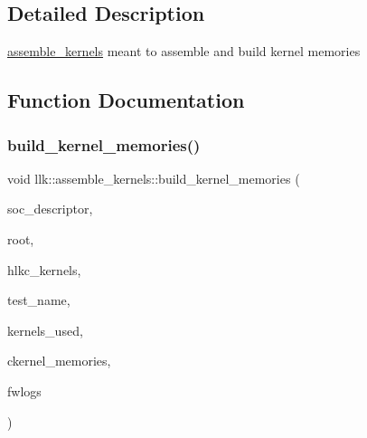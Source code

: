 \subsection{Detailed Description}
\hyperlink{namespacellk_1_1assemble__kernels}{assemble\+\_\+kernels} meant to assemble and build kernel memories 

\subsection{Function Documentation}
\mbox{\label{namespacellk_1_1assemble__kernels_a7aa5c5270196ee870fd874bc6c5b30aa}} 
\subsubsection{\texorpdfstring{build\+\_\+kernel\+\_\+memories()}{build\_kernel\_memories()}}
{\footnotesize\ttfamily void llk\+::assemble\+\_\+kernels\+::build\+\_\+kernel\+\_\+memories (\begin{DoxyParamCaption}\item[{\hyperlink{structllk_1_1SocDescriptor}{llk\+::\+Soc\+Descriptor}}]{soc\+\_\+descriptor,  }\item[{std\+::string}]{root,  }\item[{bool}]{hlkc\+\_\+kernels,  }\item[{std\+::string}]{test\+\_\+name,  }\item[{std\+::unordered\+\_\+map$<$ \hyperlink{structllk_1_1xy__pair}{llk\+::xy\+\_\+pair}, std\+::vector$<$ std\+::vector$<$ std\+::string $>$$>$$>$ \&}]{kernels\+\_\+used,  }\item[{std\+::unordered\+\_\+map$<$ \hyperlink{structllk_1_1xy__pair}{llk\+::xy\+\_\+pair}, std\+::vector$<$ \hyperlink{classllk_1_1memory}{llk\+::memory} $>$$>$ \&}]{ckernel\+\_\+memories,  }\item[{std\+::unordered\+\_\+map$<$ \hyperlink{structllk_1_1xy__pair}{llk\+::xy\+\_\+pair}, std\+::string $>$ \&}]{fwlogs }\end{DoxyParamCaption})}

\mbox{\label{namespacellk_1_1assemble__kernels_a0c64d9c4bdd026cef18dbede1e95f601}} 
